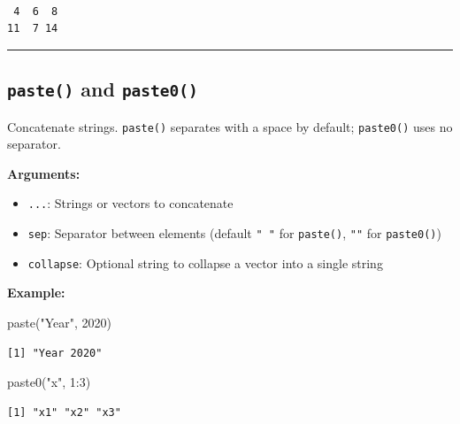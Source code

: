 \documentclass[
  letterpaper,
  DIV=11,
  numbers=noendperiod]{scrreprt}
\newenvironment{Shaded}{\begin{snugshade}}{\end{snugshade}}
\newcommand{\DecValTok}[1]{\textcolor[rgb]{0.68,0.00,0.00}{#1}}
\newcommand{\FunctionTok}[1]{\textcolor[rgb]{0.28,0.35,0.67}{#1}}
\newcommand{\NormalTok}[1]{\textcolor[rgb]{0.00,0.23,0.31}{#1}}
\newcommand{\SpecialCharTok}[1]{\textcolor[rgb]{0.37,0.37,0.37}{#1}}
\newcommand{\StringTok}[1]{\textcolor[rgb]{0.13,0.47,0.30}{#1}}
\providecommand{\tightlist}{%
  \setlength{\itemsep}{0pt}\setlength{\parskip}{0pt}}
\begin{document}
\begin{verbatim}

 4  6  8 
11  7 14 
\end{verbatim}

\begin{center}\rule{0.5\linewidth}{0.5pt}\end{center}

\subsection{\texorpdfstring{\texttt{paste()} and
\texttt{paste0()}}{paste() and paste0()}}\label{paste-and-paste0}

Concatenate strings. \texttt{paste()} separates with a space by default;
\texttt{paste0()} uses no separator.

\textbf{Arguments:}

\begin{itemize}
\tightlist
\item
  \texttt{...}: Strings or vectors to concatenate
\item
  \texttt{sep}: Separator between elements (default \texttt{"\ "} for
  \texttt{paste()}, \texttt{""} for \texttt{paste0()})
\item
  \texttt{collapse}: Optional string to collapse a vector into a single
  string
\end{itemize}

\textbf{Example:}

\begin{Shaded}
\begin{Highlighting}[]
\FunctionTok{paste}\NormalTok{(}\StringTok{"Year"}\NormalTok{, }\DecValTok{2020}\NormalTok{)}
\end{Highlighting}
\end{Shaded}

\begin{verbatim}
[1] "Year 2020"
\end{verbatim}

\begin{Shaded}
\begin{Highlighting}[]
\FunctionTok{paste0}\NormalTok{(}\StringTok{"x"}\NormalTok{, }\DecValTok{1}\SpecialCharTok{:}\DecValTok{3}\NormalTok{)}
\end{Highlighting}
\end{Shaded}

\begin{verbatim}
[1] "x1" "x2" "x3"
\end{verbatim}
\end{document}
